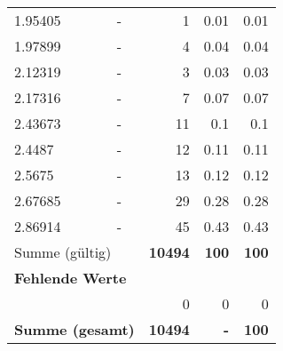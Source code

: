 \begin{longtable}{lXrrr}
        1.95405 & \multicolumn{1}{X}{-} & %
          \num{1} &
          \num[round-mode=places,round-precision=2]{0,01} &
          \num[round-mode=places,round-precision=2]{0,01} \\

        1.97899 & \multicolumn{1}{X}{-} & %
          \num{4} &
          \num[round-mode=places,round-precision=2]{0,04} &
          \num[round-mode=places,round-precision=2]{0,04} \\

        2.12319 & \multicolumn{1}{X}{-} & %
          \num{3} &
          \num[round-mode=places,round-precision=2]{0,03} &
          \num[round-mode=places,round-precision=2]{0,03} \\

        2.17316 & \multicolumn{1}{X}{-} & %
          \num{7} &
          \num[round-mode=places,round-precision=2]{0,07} &
          \num[round-mode=places,round-precision=2]{0,07} \\

        2.43673 & \multicolumn{1}{X}{-} & %
          \num{11} &
          \num[round-mode=places,round-precision=2]{0,1} &
          \num[round-mode=places,round-precision=2]{0,1} \\

        2.4487 & \multicolumn{1}{X}{-} & %
          \num{12} &
          \num[round-mode=places,round-precision=2]{0,11} &
          \num[round-mode=places,round-precision=2]{0,11} \\

        2.5675 & \multicolumn{1}{X}{-} & %
          \num{13} &
          \num[round-mode=places,round-precision=2]{0,12} &
          \num[round-mode=places,round-precision=2]{0,12} \\

        2.67685 & \multicolumn{1}{X}{-} & %
          \num{29} &
          \num[round-mode=places,round-precision=2]{0,28} &
          \num[round-mode=places,round-precision=2]{0,28} \\

        2.86914 & \multicolumn{1}{X}{-} & %
          \num{45} &
          \num[round-mode=places,round-precision=2]{0,43} &
          \num[round-mode=places,round-precision=2]{0,43} \\

     \midrule
     \multicolumn{2}{l}{Summe (gültig)} &
       \textbf{\num{10494}} &
     \textbf{100} &
       \textbf{\num[round-mode=places,round-precision=2]{100}} \\
     \multicolumn{5}{l}{\textbf{Fehlende Werte}}\\
      & & 0 & 0 & 0 \\
     \midrule
     \multicolumn{2}{l}{\textbf{Summe (gesamt)}} &
          \textbf{\num{10494}} &
        \textbf{-} &
        \textbf{100} \\
     \bottomrule
     \end{longtable}
     
